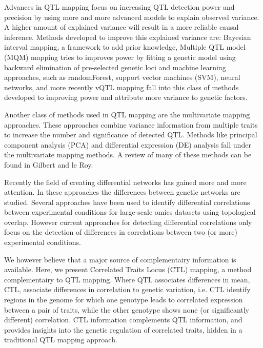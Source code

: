   Advances in QTL mapping focus on increasing QTL detection power and precision by using more and more advanced models to explain 
  observed variance. A higher amount of explained variance will result in a more reliable causal inference\cite{Li:2010}. Methods 
  developed to improve this explained variance are: Bayesian interval mapping, a framework to add prior knowledge\cite{Yandell:2007, 
  Hageman:2011}, Multiple QTL model (MQM) mapping tries to improves power by fitting a genetic model using backward elimination of 
  pre-selected genetic loci\cite{Jansen:1993, Arends:2010} and machine learning approaches, such as randomForest\cite{Bureau:2003}, 
  support vector machines (SVM), neural networks, and more recently vQTL mapping\cite{Valdar:2011} fall into this class of methods
  developed to improving power and attribute more variance to genetic factors.

  Another class of methods used in QTL mapping are the multivariate mapping approaches. These approaches combine variance information 
  from multiple traits to increase the number and significance of detected QTL. Methods like principal component analysis (PCA) and 
  differential expression (DE) analysis fall under the multivariate mapping methods. A review of many of these methods can be found 
  in Gilbert and le Roy\cite{Gilbert:2003}.

  Recently the field of creating differential networks has gained more and more attention. In these approaches the differences 
  between genetic networks are studied\cite{Fuente:2010,Horvath:2008}. Several approaches have been used to identify differential 
  correlations between experimental conditions for large-scale omics datasets using topological overlap\cite{Tesson:2010}. However 
  current approaches for detecting differential correlations only focus on the detection of differences in correlations between 
  two (or more) experimental conditions\cite{Fukushima:2013, Tesson:2010,Horvath:2008}. 

  We however believe that a major source of complementairy information is available. Here, we present Correlated Traits Locus (CTL) 
  mapping, a method complementairy to QTL mapping. Where QTL associates differences in mean, CTL, associate differences in correlation to 
  genetic variation, i.e. CTL identify regions in the genome for which one genotype leads to correlated expression between a pair of 
  traits, while the other genotype shows none (or significantly different) correlation. CTL information complements QTL information, 
  and provides insights into the genetic regulation of correlated traits, hidden in a traditional QTL mapping approach.
  
